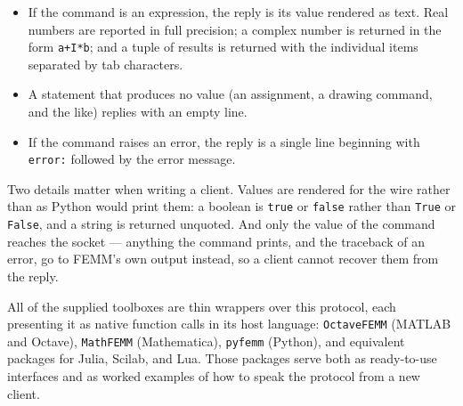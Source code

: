 \begin{itemize}
\item If the command is an expression, the reply is its value rendered as text.
      Real numbers are reported in full precision; a complex number is returned
      in the form \verb|a+I*b|; and a tuple of results is returned with the
      individual items separated by tab characters.
\item A statement that produces no value (an assignment, a drawing command, and
      the like) replies with an empty line.
\item If the command raises an error, the reply is a single line beginning with
      \verb+error:+ followed by the error message.
\end{itemize}

Two details matter when writing a client.  Values are rendered for the wire
rather than as Python would print them: a boolean is {\tt true} or
{\tt false} rather than {\tt True} or {\tt False}, and a string is returned
unquoted.  And only the value of the command reaches the socket --- anything
the command prints, and the traceback of an error, go to FEMM's own output
instead, so a client cannot recover them from the reply.

All of the supplied toolboxes are thin wrappers over this protocol, each
presenting it as native function calls in its host language: {\tt OctaveFEMM}
(MATLAB and Octave), {\tt MathFEMM} (Mathematica), {\tt pyfemm} (Python), and
equivalent packages for Julia, Scilab, and Lua.  Those packages serve both as
ready-to-use interfaces and as worked examples of how to speak the protocol
from a new client.
